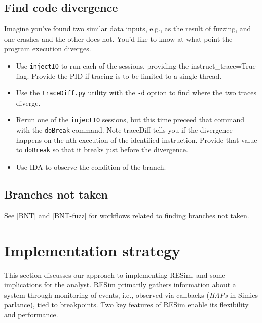 \documentclass[titlepage]{article}
\begin{document}
\subsection{Find code divergence}
Imagine you've found two similar data inputs, e.g., as the result of fuzzing, and one
crashes and the other does not.  You'd like to know at what point the program execution diverges.
\begin{itemize}
\item Use {\tt injectIO} to run each of the sessions, providing the instruct\_trace=True flag.  Provide the PID if
tracing is to be limited to a single thread.
\item Use the {\tt traceDiff.py} utility with the {\tt -d} option to find where the two traces diverge.
\item Rerun one of the {\tt injectIO} sessions, but this time preceed that command with the {\tt doBreak} command.
Note traceDiff tells you if the divergence happens on the nth execution of the identified instruction.  Provide that
value to {\tt doBreak} so that it breaks just before the divergence.
\item Use IDA to observe the condition of the branch.
\end{itemize}

\subsection{Branches not taken}
See \ref{BNT} and \ref{BNT-fuzz} for workflows related to finding branches not taken.

\section{Implementation strategy}
\label{implementation}
This section discusses our approach to implementing RESim, and some implications for the analyst.
RESim primarily gathers information about a system through monitoring of events, i.e., observed via callbacks (\textit{HAPs} in Simics parlance), tied to 
breakpoints.  Two key features of RESim enable its flexibility and performance.  
\end{document}
